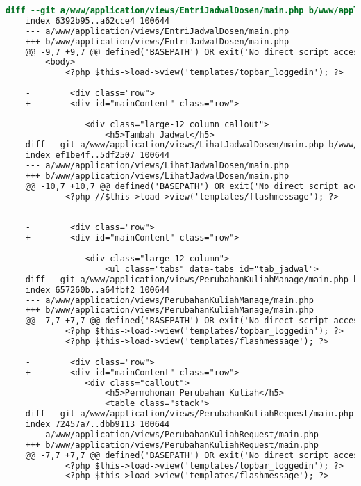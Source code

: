 \begin{lstlisting}[frame=single, label={lst:perbaikan_2.4.1_bypass_blocks}, language=diff, caption=Perbaikan Kriteria Sukses 2.4.1 - Mekanisme untuk Melompati Area Konten yang Berulang]
    diff --git a/www/application/views/EntriJadwalDosen/main.php b/www/application/views/EntriJadwalDosen/main.php
    index 6392b95..a62cce4 100644
    --- a/www/application/views/EntriJadwalDosen/main.php
    +++ b/www/application/views/EntriJadwalDosen/main.php
    @@ -9,7 +9,7 @@ defined('BASEPATH') OR exit('No direct script access allowed');
        <body>
            <?php $this->load->view('templates/topbar_loggedin'); ?>
    
    -        <div class="row">
    +        <div id="mainContent" class="row">
    
                <div class="large-12 column callout">
                    <h5>Tambah Jadwal</h5>
    diff --git a/www/application/views/LihatJadwalDosen/main.php b/www/application/views/LihatJadwalDosen/main.php
    index ef1be4f..5df2507 100644
    --- a/www/application/views/LihatJadwalDosen/main.php
    +++ b/www/application/views/LihatJadwalDosen/main.php
    @@ -10,7 +10,7 @@ defined('BASEPATH') OR exit('No direct script access allowed');
            <?php //$this->load->view('templates/flashmessage'); ?>
    
    
    -        <div class="row">
    +        <div id="mainContent" class="row">
    
                <div class="large-12 column">
                    <ul class="tabs" data-tabs id="tab_jadwal">
    diff --git a/www/application/views/PerubahanKuliahManage/main.php b/www/application/views/PerubahanKuliahManage/main.php
    index 657260b..a64fbf2 100644
    --- a/www/application/views/PerubahanKuliahManage/main.php
    +++ b/www/application/views/PerubahanKuliahManage/main.php
    @@ -7,7 +7,7 @@ defined('BASEPATH') OR exit('No direct script access allowed');
            <?php $this->load->view('templates/topbar_loggedin'); ?>
            <?php $this->load->view('templates/flashmessage'); ?>
    
    -        <div class="row">
    +        <div id="mainContent" class="row">
                <div class="callout">
                    <h5>Permohonan Perubahan Kuliah</h5>
                    <table class="stack">
    diff --git a/www/application/views/PerubahanKuliahRequest/main.php b/www/application/views/PerubahanKuliahRequest/main.php
    index 72457a7..dbb9113 100644
    --- a/www/application/views/PerubahanKuliahRequest/main.php
    +++ b/www/application/views/PerubahanKuliahRequest/main.php
    @@ -7,7 +7,7 @@ defined('BASEPATH') OR exit('No direct script access allowed');
            <?php $this->load->view('templates/topbar_loggedin'); ?>
            <?php $this->load->view('templates/flashmessage'); ?>
    

\end{lstlisting}
